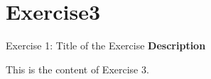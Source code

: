 \section{Exercise3}

\begin{frame}{Exercise 1: Title of the Exercise}
\textbf{Description}

This is the content of Exercise 3.
\end{frame}
